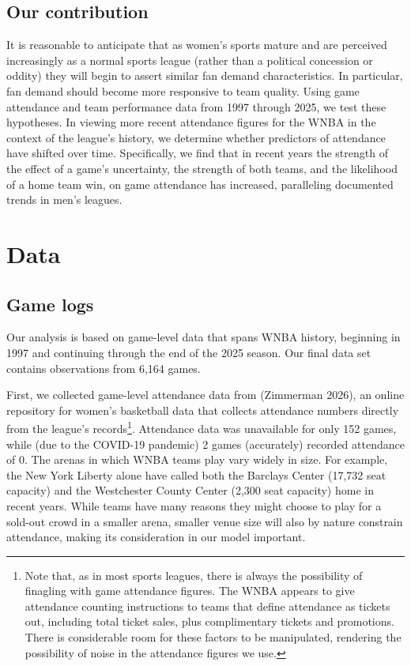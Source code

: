 \documentclass[
  letterpaper,
  DIV=11,
  numbers=noendperiod]{scrartcl}
\begin{document}
\subsection{Our contribution}\label{our-contribution}

It is reasonable to anticipate that as women's sports mature and are
perceived increasingly as a normal sports league (rather than a
political concession or oddity) they will begin to assert similar fan
demand characteristics. In particular, fan demand should become more
responsive to team quality. Using game attendance and team performance
data from 1997 through 2025, we test these hypotheses. In viewing more
recent attendance figures for the WNBA in the context of the league's
history, we determine whether predictors of attendance have shifted over
time. Specifically, we find that in recent years the strength of the
effect of a game's uncertainty, the strength of both teams, and the
likelihood of a home team win, on game attendance has increased,
paralleling documented trends in men's leagues.

\section{Data}\label{sec-data}

\subsection{Game logs}\label{game-logs}

Our analysis is based on game-level data that spans WNBA history,
beginning in 1997 and continuing through the end of the 2025 season. Our
final data set contains observations from 6,164 games.

First, we collected game-level attendance data from (Zimmerman 2026), an
online repository for women's basketball data that collects attendance
numbers directly from the league's records\footnote{Note that, as in
  most sports leagues, there is always the possibility of finagling with
  game attendance figures. The WNBA appears to give attendance counting
  instructions to teams that define attendance as tickets out, including
  total ticket sales, plus complimentary tickets and promotions. There
  is considerable room for these factors to be manipulated, rendering
  the possibility of noise in the attendance figures we use.}.
Attendance data was unavailable for only 152 games, while (due to the
COVID-19 pandemic) 2 games (accurately) recorded attendance of 0. The
arenas in which WNBA teams play vary widely in size. For example, the
New York Liberty alone have called both the Barclays Center (17,732 seat
capacity) and the Westchester County Center (2,300 seat capacity) home
in recent years. While teams have many reasons they might choose to play
for a sold-out crowd in a smaller arena, smaller venue size will also by
nature constrain attendance, making its consideration in our model
important.
\end{document}
